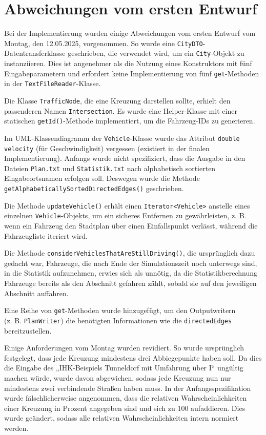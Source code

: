 \chapter{Abweichungen vom ersten Entwurf}
Bei der Implementierung wurden einige Abweichungen vom ersten Entwurf vom Montag, den 12.05.2025, vorgenommen.
So wurde eine \texttt{CityDTO}-Datentransferklasse geschrieben, die verwendet wird, um ein \texttt{City}-Objekt zu instanziieren.
Dies ist angenehmer als die Nutzung eines Konstruktors mit fünf Eingabeparametern und erfordert keine Implementierung von
fünf \texttt{get}-Methoden in der \texttt{TextFileReader}-Klasse.

Die Klasse \texttt{TrafficNode}, die eine Kreuzung darstellen sollte, erhielt den passenderen Namen \texttt{Intersection}.
Es wurde eine Helper-Klasse mit einer statischen \texttt{getId()}-Methode implementiert, um die Fahrzeug-IDs zu generieren.

Im UML-Klassendiagramm der \texttt{Vehicle}-Klasse wurde das Attribut \texttt{double velocity} (für Geschwindigkeit) vergessen (existiert in der finalen Implementierung).
Anfangs wurde nicht spezifiziert, dass die Ausgabe in den Dateien \texttt{Plan.txt} und \texttt{Statistik.txt} nach alphabetisch sortierten Eingabeortsnamen erfolgen soll.
Deswegen wurde die Methode \texttt{getAlphabeticallySortedDirectedEdges()} geschrieben.

Die Methode \texttt{updateVehicle()} erhält einen \texttt{Iterator<Vehicle>} anstelle eines einzelnen \texttt{Vehicle}-Objekts, um ein sicheres Entfernen zu gewährleisten,
z. B. wenn ein Fahrzeug den Stadtplan über einen Einfallspunkt verlässt, während die Fahrzeugliste iteriert wird.

Die Methode \texttt{considerVehiclesThatAreStillDriving()}, die ursprünglich dazu gedacht war, Fahrzeuge,
die nach Ende der Simulationszeit noch unterwegs sind, in die Statistik aufzunehmen,
erwies sich als unnötig, da die Statistikberechnung Fahrzeuge bereits als den Abschnitt gefahren zählt,
sobald sie auf den jeweiligen Abschnitt auffahren.

Eine Reihe von \texttt{get}-Methoden wurde hinzugefügt, um den Outputwritern \\
(z. B. \texttt{PlanWriter}) die benötigten Informationen wie die \texttt{directedEdges} bereitzustellen.

Einige Anforderungen vom Montag wurden revidiert. So wurde ursprünglich festgelegt, dass jede Kreuzung mindestens drei Abbiegepunkte haben soll.
Da dies die Eingabe des „IHK-Beispiels Tunneldorf mit Umfahrung über I“ ungültig machen würde, wurde davon abgewichen,
sodass jede Kreuzung nun nur mindestens zwei verbindende Straßen haben muss.
In der Anfangsspezifikation wurde fälschlicherweise angenommen, dass die relativen Wahrscheinlichkeiten einer Kreuzung in
Prozent angegeben sind und sich zu 100 aufaddieren. Dies wurde geändert, sodass alle relativen Wahrscheinlichkeiten intern normiert werden.



